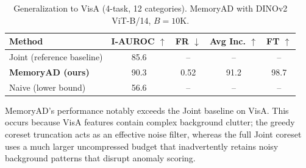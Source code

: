 \begin{table}[t]
\centering
\caption{Generalization to VisA (4-task, 12 categories). MemoryAD with DINOv2 ViT-B/14, $B=10\text{K}$.}
\label{tab:visa_results}
\begin{tabular}{lcccc}
\toprule
Method & I-AUROC $\uparrow$ & FR $\downarrow$ & Avg Inc. $\uparrow$ & FT $\uparrow$ \\
\midrule
Joint (reference baseline) & 85.6 & -- & -- & -- \\
\textbf{MemoryAD (ours)} & 90.3 & 0.52 & 91.2 & 98.7 \\
Naive (lower bound) & 56.6 & -- & -- & -- \\
\bottomrule
\end{tabular}
\vspace{1mm}
\footnotesize{MemoryAD's performance notably exceeds the Joint baseline on VisA. This occurs because VisA features contain complex background clutter; the greedy coreset truncation acts as an effective noise filter, whereas the full Joint coreset uses a much larger uncompressed budget that inadvertently retains noisy background patterns that disrupt anomaly scoring.}
\end{table}